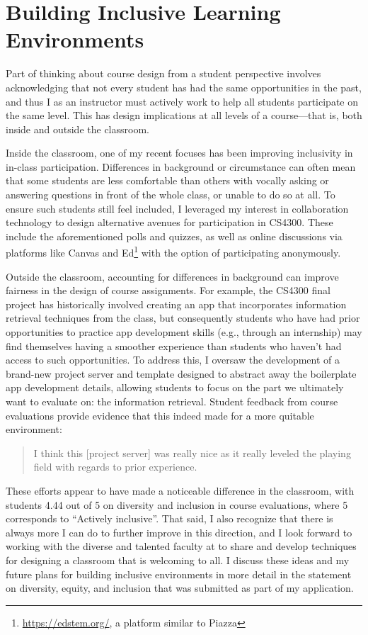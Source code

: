 \documentclass[12pt,letterpaper]{article}
\begin{document}
\section{Building Inclusive Learning Environments}
Part of thinking about course design from a student perspective involves acknowledging that not every student has had the same opportunities in the past, and thus I as an instructor must actively work to help all students participate on the same level.
This has design implications at all levels of a course---that is, both inside and outside the classroom.

Inside the classroom, one of my recent focuses has been improving inclusivity in in-class participation.
Differences in background or circumstance can often mean that some students are less comfortable than others with vocally asking or answering questions in front of the whole class, or unable to do so at all.
To ensure such students still feel included, I leveraged my interest in collaboration technology to design alternative avenues for participation in CS4300.
These include the aforementioned polls and quizzes, as well as online discussions via platforms like Canvas and Ed\footnote{\url{https://edstem.org/}, a platform similar to Piazza} with the option of participating anonymously.

Outside the classroom, accounting for differences in background can improve fairness in the design of course assignments.
For example, the CS4300 final project has historically involved creating an app that incorporates information retrieval techniques from the class, but consequently students who have had prior opportunities to practice app development skills (e.g., through an internship) may find themselves having a smoother experience than students who haven't had access to such opportunities.
To address this, I oversaw the development of a brand-new project server and template designed to abstract away the boilerplate app development details, allowing students to focus on the part we ultimately want to evaluate on: the information retrieval.
Student feedback from course evaluations provide evidence that this indeed made for a more quitable environment:
\begin{quote}
I think this [project server] was really nice as it really leveled the playing field with regards to prior experience.
\end{quote}

These efforts appear to have made a noticeable difference in the classroom, with students 4.44 out of 5 on diversity and inclusion in course evaluations, where 5 corresponds to ``Actively inclusive''.
That said, I also recognize that there is always more I can do to further improve in this direction, and I look forward to working with the diverse and talented faculty at \schoolname to share and develop techniques for designing a classroom that is welcoming to all.
\iflongdei
I discuss these ideas and my future plans for building inclusive environments in more detail in the statement on diversity, equity, and inclusion that was submitted as part of my application.
\else
%
\fi
\end{document}
